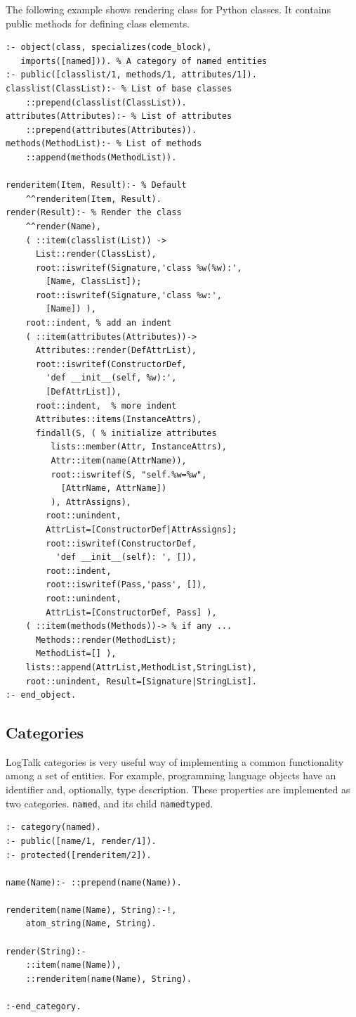 \documentclass[12pt,a4paper]{llncs}
\begin{document}
The following example shows rendering class for Python classes. It contains public methods for defining class elements.
\begin{multicols}{2}
\begin{verbatim}
:- object(class, specializes(code_block),
   imports([named])). % A category of named entities
:- public([classlist/1, methods/1, attributes/1]).
classlist(ClassList):- % List of base classes
    ::prepend(classlist(ClassList)).
attributes(Attributes):- % List of attributes
    ::prepend(attributes(Attributes)).
methods(MethodList):- % List of methods
    ::append(methods(MethodList)).

renderitem(Item, Result):- % Default
    ^^renderitem(Item, Result).
render(Result):- % Render the class
    ^^render(Name),
    ( ::item(classlist(List)) ->
      List::render(ClassList),
      root::iswritef(Signature,'class %w(%w):',
        [Name, ClassList]);
      root::iswritef(Signature,'class %w:',
        [Name]) ),
    root::indent, % add an indent
    ( ::item(attributes(Attributes))->
      Attributes::render(DefAttrList),
      root::iswritef(ConstructorDef,
        'def __init__(self, %w):',
        [DefAttrList]),
      root::indent,  % more indent
      Attributes::items(InstanceAttrs),
      findall(S, ( % initialize attributes
         lists::member(Attr, InstanceAttrs),
         Attr::item(name(AttrName)),
         root::iswritef(S, "self.%w=%w",
           [AttrName, AttrName])
         ), AttrAssigns),
        root::unindent,
        AttrList=[ConstructorDef|AttrAssigns];
        root::iswritef(ConstructorDef,
          'def __init__(self): ', []),
        root::indent,
        root::iswritef(Pass,'pass', []),
        root::unindent,
        AttrList=[ConstructorDef, Pass] ),
    ( ::item(methods(Methods))-> % if any ...
      Methods::render(MethodList);
      MethodList=[] ),
    lists::append(AttrList,MethodList,StringList),
    root::unindent, Result=[Signature|StringList].
:- end_object.
\end{verbatim}
\end{multicols}

\subsection{Categories}
\label{sec:cats-impl}

LogTalk categories is very useful way of implementing a common functionality among a set of entities.  For example, programming language objects have an identifier and, optionally, type description.  These properties are implemented as two categories.
\texttt{named}, and its child \texttt{namedtyped}.
\begin{verbatim}
:- category(named).
:- public([name/1, render/1]).
:- protected([renderitem/2]).

name(Name):- ::prepend(name(Name)).

renderitem(name(Name), String):-!,
    atom_string(Name, String).

render(String):-
    ::item(name(Name)),
    ::renderitem(name(Name), String).

:-end_category.
\end{verbatim}
\end{document}
